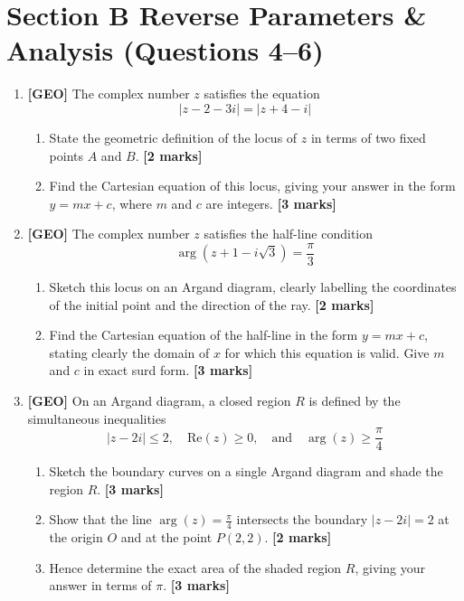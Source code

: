 \documentclass[11pt,a4paper]{article}
\begin{document}
\section*{Section B \quad Reverse Parameters \& Analysis \hfill{\normalfont\footnotesize(Questions 4--6)}}
\begin{enumerate}[resume]

\item \textbf{[GEO]} The complex number $z$ satisfies the equation
\[
|z - 2 - 3i| = |z + 4 - i|
\]
\begin{enumerate}[label=(\alph*)]
  \item State the geometric definition of the locus of $z$ in terms of two fixed points $A$ and $B$. \hfill{\textbf{[2 marks]}}
  \item Find the Cartesian equation of this locus, giving your answer in the form $y = mx + c$, where $m$ and $c$ are integers. \hfill{\textbf{[3 marks]}}
\end{enumerate}

\item \textbf{[GEO]} The complex number $z$ satisfies the half-line condition
\[
\arg(z + 1 - i\sqrt{3}) = \frac{\pi}{3}
\]
\begin{enumerate}[label=(\alph*)]
  \item Sketch this locus on an Argand diagram, clearly labelling the coordinates of the initial point and the direction of the ray. \hfill{\textbf{[2 marks]}}
  \item Find the Cartesian equation of the half-line in the form $y = mx + c$, stating clearly the domain of $x$ for which this equation is valid. Give $m$ and $c$ in exact surd form. \hfill{\textbf{[3 marks]}}
\end{enumerate}

\item \textbf{[GEO]} On an Argand diagram, a closed region $R$ is defined by the simultaneous inequalities
\[
|z - 2i| \le 2, \quad \text{Re}(z) \ge 0, \quad \text{and} \quad \arg(z) \ge \frac{\pi}{4}
\]
\begin{enumerate}[label=(\alph*)]
  \item Sketch the boundary curves on a single Argand diagram and shade the region $R$. \hfill{\textbf{[3 marks]}}
  \item Show that the line $\arg(z) = \frac{\pi}{4}$ intersects the boundary $|z - 2i| = 2$ at the origin $O$ and at the point $P(2, 2)$. \hfill{\textbf{[2 marks]}}
  \item Hence determine the exact area of the shaded region $R$, giving your answer in terms of $\pi$. \hfill{\textbf{[3 marks]}}
\end{enumerate}

\end{enumerate}
\end{document}
